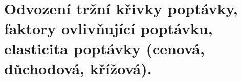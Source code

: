 \clearpage
\section{Odvození tržní křivky poptávky, faktory ovlivňující poptávku, elasticita poptávky
(cenová, důchodová, křížová).}